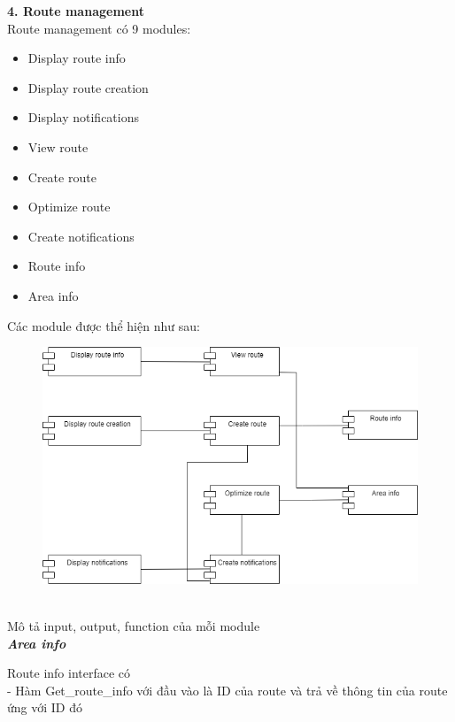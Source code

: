 \documentclass[a4paper]{article}
\begin{document}
\begin{itemize}
\newpage
\textbf{    4. Route management } \\
    Route management có 9 modules:
    \begin{itemize}
        \item Display route info
       \item Display route creation
       \item Display notifications
        \item View route
        \item Create route
        \item Optimize route
        \item Create notifications
        \item  Route info
        \item Area info
  \end{itemize}
    Các module được thể hiện như sau:\\
    \begin{figure}[!h]
    \begin{center}
      \includegraphics[width=6in]{Image/Route_Module.png}
    \end{center}
\end{figure} \\
    Mô tả input, output, function của mỗi module\\
\textbf{    \textit{Area info} } \\
\begin{minipage}[b]{0.4\textwidth}
Route info interface có \\
- Hàm Get\_route\_info với đầu vào là ID của route và trả về thông tin của route ứng với ID đó
\end{minipage}
\hfill
{}

\end{itemize}
\end{document}
